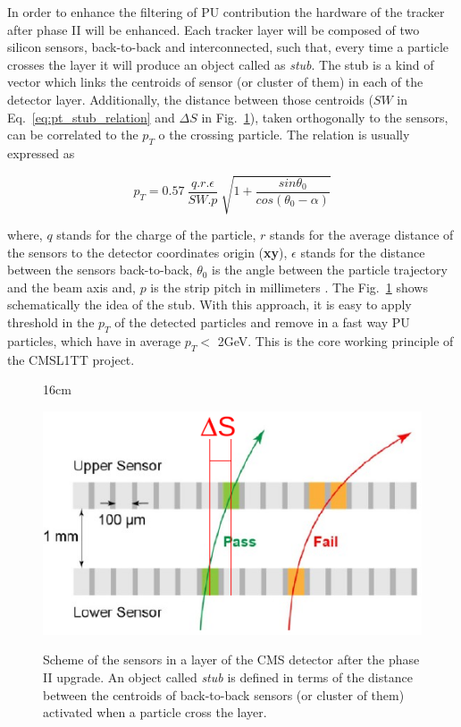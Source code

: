In order to enhance the filtering of PU contribution the hardware of the tracker after phase II will be enhanced. Each tracker layer will be composed of two silicon sensors, back-to-back and interconnected, such that, every time a particle crosses the layer it will produce an object called as \textit{stub}. The stub is a kind of vector which links the centroids of sensor (or cluster of them) in each of the detector layer. Additionally, the distance between those centroids ($SW$ in Eq.~\ref{eq:pt_stub_relation} and $\Delta S$ in Fig.~\ref{fig:stub_definition}), taken orthogonally to the sensors, can be correlated to the $p_{T}$ o the crossing particle. The relation is usually expressed as

\begin{equation}
p_{T} = 0.57 ~ \frac{q . r . \epsilon}{SW . p} ~ \sqrt{1+\frac{sin \theta_{0}}{cos(\theta_{0}-\alpha)}}
\label{eq:pt_stub_relation}
\end{equation}

where, $q$ stands for the charge of the particle, $r$ stands for the average distance of the sensors to the detector coordinates origin (\textbf{xy}), $\epsilon$ stands for the distance between the sensors back-to-back, $\theta_{0}$ is the angle between the particle trajectory and the beam axis and, $p$ is the strip pitch in millimeters \cite{bib:CMS-TDR-17-001}. The Fig.~\ref{fig:stub_definition} shows schematically the idea of the stub. With this approach, it is easy to apply threshold in the $p_{T}$ of the detected particles and remove in a fast way PU particles, which have in average $p_{T} <$ 2GeV. This is the core working principle of the CMSL1TT project.

\begin{figure}[htbp]{16cm}
	\caption{Scheme of the sensors in a layer of the CMS detector after the phase II upgrade. An object called \textit{stub} is defined in terms of the distance between the centroids of back-to-back sensors (or cluster of them) activated when a particle cross the layer.}
	\centering
	\includegraphics[scale=0.6]{AppendixCMSL1TT/figs/stub_definition}
	\label{fig:stub_definition}
\end{figure}

